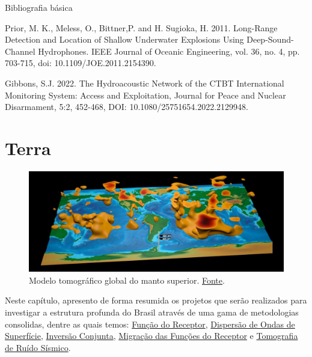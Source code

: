 \documentclass[10pt,a4paper,oneside]{book}
\newcommand{\HeroFigPad}{\vspace{-1cm}}
\begin{document}
\begin{fancyenum}{\faBook}{Bibliografia básica}
	\item Prior, M. K., Meless, O., Bittner,P. and H. Sugioka, H. 2011. Long-Range Detection and Location of Shallow Underwater Explosions Using Deep-Sound-Channel Hydrophones. IEEE Journal of Oceanic Engineering, vol. 36, no. 4, pp. 703-715, doi: 10.1109/JOE.2011.2154390.
	\item Gibbons, S.J. 2022. The Hydroacoustic Network of the CTBT International Monitoring System: Access and Exploitation, Journal for Peace and Nuclear Disarmament, 5:2, 452-468, DOI: 10.1080/25751654.2022.2129948.
\end{fancyenum}

\chapter{Terra}
\label{cap_terra}

\begin{figure}[h]
	\HeroFigPad
	\begin{center}
		\includegraphics[width=\textwidth]{images/globe_structure.jpg}
	\end{center}
	\caption{
	Modelo tomográfico global do manto superior. \href{https://www.olcf.ornl.gov/2017/03/28/a-seismic-mapping-milestone/}{Fonte}.
    }
 \label{fig_structure}
\end{figure}

Neste capítulo, apresento de forma resumida os projetos que serão realizados para investigar a estrutura profunda do Brasil através de uma gama de metodologias consolidas, dentre as quais temos: \href{https://doi.org/10.1029/JB084iB09p04749}{Função do Receptor}, \href{https://doi.org/10.1111/j.1365-246X.1990.tb04573.x}{Dispersão de Ondas de Superfície}, \href{https://doi.org/10.1046/j.1365-246x.2000.00217.x}{Inversão Conjunta}, \href{https://doi.org/10.1016/j.epsl.2013.08.025}{Migração das Funções do Receptor} e \href{https://doi.org/10.1111/j.1365-246X.2007.03374.x}{Tomografia de Ruído Sísmico}.   
\end{document}
